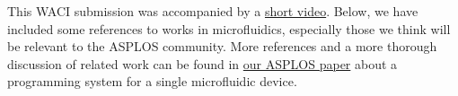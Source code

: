 \documentclass[sigplan, screen, nonacm]{acmart}
\begin{document}

\newpage

This WACI submission was accompanied by a \href{https://mwillsey.com/assets/2019-waci-droplets.m4v}{short video}.
Below, we have included some references to works in microfluidics, especially those we think will be relevant to the ASPLOS community.
More references and a more thorough discussion of related work can be found in \href{https://mwillsey.com/papers/2019-asplos-puddle.pdf}{our ASPLOS paper} about a programming system for a single microfluidic device.

\nocite{*}



\end{document}
